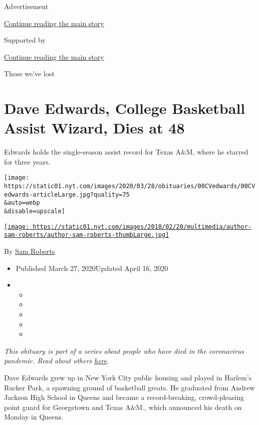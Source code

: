 Advertisement

\protect\hyperlink{after-top}{Continue reading the main story}

Supported by

\protect\hyperlink{after-sponsor}{Continue reading the main story}

Those we've lost

\hypertarget{dave-edwards-college-basketball-assist-wizard-dies-at-48}{%
\section{Dave Edwards, College Basketball Assist Wizard, Dies at
48}\label{dave-edwards-college-basketball-assist-wizard-dies-at-48}}

Edwards holds the single-season assist record for Texas A\&M, where he
starred for three years.

\texttt{[image: https://static01.nyt.com/images/2020/03/28/obituaries/00CVedwards/00CVedwards-articleLarge.jpg?quality=75\\\&auto=webp\\\&disable=upscale]}

\href{https://www.nytimes.com/by/sam-roberts}{\texttt{[image: https://static01.nyt.com/images/2018/02/20/multimedia/author-sam-roberts/author-sam-roberts-thumbLarge.jpg]}}

By \href{https://www.nytimes.com/by/sam-roberts}{Sam Roberts}

\begin{itemize}
\item
  Published March 27, 2020Updated April 16, 2020
\item
  \begin{itemize}
  \item
  \item
  \item
  \item
  \item
  \end{itemize}
\end{itemize}

\emph{This obituary is part of a series about people who have died in
the coronavirus pandemic. Read about others}
\href{https://www.nytimes.com/series/people-who-have-died-of-the-coronavirus}{\emph{here}}\emph{.}

Dave Edwards grew up in New York City public housing and played in
Harlem's Rucker Park, a spawning ground of basketball greats. He
graduated from Andrew Jackson High School in Queens and became a
record-breaking, crowd-pleasing point guard for Georgetown and Texas
A\&M., which announced his death on Monday in Queens.

